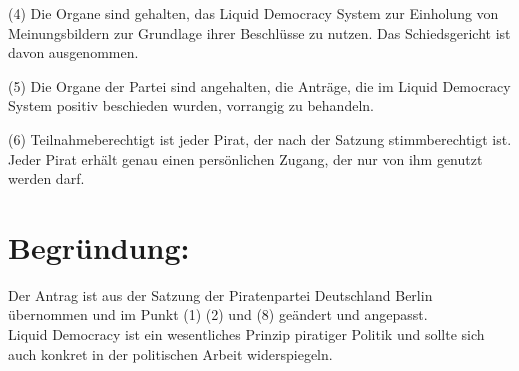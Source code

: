 (4) Die Organe sind gehalten, das Liquid Democracy System zur Einholung von Meinungsbildern zur Grundlage ihrer Beschlüsse zu nutzen. Das Schiedsgericht ist davon ausgenommen.

(5) Die Organe der Partei sind angehalten, die Anträge, die im Liquid Democracy System positiv beschieden wurden, vorrangig zu behandeln.

(6) Teilnahmeberechtigt ist jeder Pirat, der nach der Satzung stimmberechtigt ist. Jeder Pirat erhält genau einen persönlichen Zugang, der nur von ihm genutzt werden darf.

\section{Begründung:}

Der Antrag ist aus der Satzung der Piratenpartei Deutschland Berlin übernommen und im Punkt (1) (2) und (8) geändert und angepasst.\\Liquid Democracy ist ein wesentliches Prinzip piratiger Politik und sollte sich auch konkret in der politischen Arbeit widerspiegeln.
